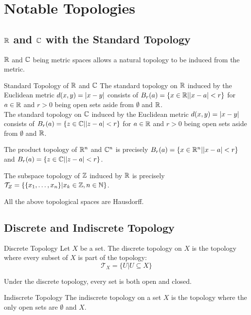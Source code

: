 \documentclass[a4paper]{article}
\begin{document}
\pagebreak
\section{Notable Topologies}
\subsection{$\mathbb{R}$ and $\mathbb{C}$ with the Standard Topology}
$\mathbb{R}$ and $\mathbb{C}$ being metric spaces allows a natural topology to be induced from the metric. 
\begin{defn}{Standard Topology of $\mathbb{R}$ and $\mathbb{C}$}{} The standard topology on $\mathbb{R}$ induced by the Euclidean metric $d(x,y)=\abs{x-y}$ consists of $B_r(a)=\{x\in\mathbb{R}|\abs{x-a}<r\}$ for $a\in\mathbb{R}$ and $r>0$ being open sets aside from $\emptyset$ and $\mathbb{R}$. \\
The standard topology on $\mathbb{C}$ induced by the Euclidean metric $d(x,y)=\abs{x-y}$ consists of $B_r(a)=\{z\in\mathbb{C}|\abs{z-a}<r\}$ for $a\in\mathbb{R}$ and $r>0$ being open sets aside from $\emptyset$ and $\mathbb{R}$. 
\end{defn}

\begin{prp}{}{} The product topology of $\mathbb{R}^n$ and $\mathbb{C}^n$ is precisely $B_r(a)=\{x\in\mathbb{R}^n|\abs{x-a}<r\}$ and $B_r(a)=\{z\in\mathbb{C}|\abs{z-a}<r\}$. 
\end{prp}

\begin{prp}{}{} The subspace topology of $\mathbb{Z}$ induced by $\mathbb{R}$ is precisely $\mathcal{T}_Z=\{\{x_1,\dots,x_n\}|x_k\in\mathbb{Z},n\in\mathbb{N}\}$. 
\end{prp}

\begin{prp}{}{} All the above topological spaces are Hausdorff. 
\end{prp}

\subsection{Discrete and Indiscrete Topology}
\begin{defn}{Discrete Topology}{} Let $X$ be a set. The discrete topology on $X$ is the topology where every subset of $X$ is part of the topology: $$\mathcal{T}_X=\{U|U\subseteq X\}$$
\end{defn}

\begin{prp}{}{} Under the discrete topology, every set is both open and closed. 
\end{prp}

\begin{defn}{Indiscrete Topology}{} The indiscrete topology on a set $X$ is the topology where the only open sets are $\emptyset$ and $X$. 
\end{defn}
\end{document}
